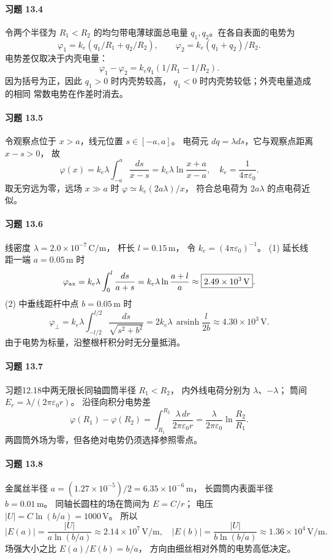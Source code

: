\paragraph{习题 13.4}
令两个半径为 \(R_1<R_2\) 的均匀带电薄球面总电量
\(q_1,q_2\)。在各自表面的电势为
\[
 \boxed{\varphi_1=k_e(q_1/R_1+q_2/R_2)},\qquad
 \boxed{\varphi_2=k_e(q_1+q_2)/R_2}.
\]
电势差仅取决于内壳电量：
\[
 \boxed{\varphi_1-\varphi_2
 =k_eq_1(1/R_1-1/R_2)}.
\]
因为括号为正，因此 \(q_1>0\) 时内壳势较高，
\(q_1<0\) 时内壳势较低；外壳电量造成的相同
常数电势在作差时消去。

\paragraph{习题 13.5}
令观察点位于 \(x>a\)，线元位置 \(s\in[-a,a]\)。
电荷元 \(dq=\lambda ds\)，它与观察点距离 \(x-s>0\)，
故
\[
 \varphi(x)=k_e\lambda\int_{-a}^a\frac{ds}{x-s}
 =\boxed{k_e\lambda\ln\frac{x+a}{x-a}},\quad
 k_e=\frac1{4\pi\varepsilon_0}.
\]
取无穷远为零，远场 \(x\gg a\) 时
\(\varphi\simeq k_e(2a\lambda)/x\)，
符合总电荷为 \(2a\lambda\) 的点电荷近似。

\paragraph{习题 13.6}
线密度 \(\lambda=2.0\times10^{-7}\,\mathrm{C/m}\)，
杆长 \(l=0.15\,\mathrm m\)，
令 \(k_e=(4\pi\varepsilon_0)^{-1}\)。
(1) 延长线距一端 \(a=0.05\,\mathrm m\) 时
\[
 \varphi_{\rm ax}=k_e\lambda\int_0^l\frac{ds}{a+s}
 =k_e\lambda\ln\frac{a+l}{a}
 \approx\boxed{2.49\times10^3\,\mathrm V}.
\]
(2) 中垂线距杆中点 \(b=0.05\,\mathrm m\) 时
\[
 \varphi_\perp=k_e\lambda
 \int_{-l/2}^{l/2}\frac{ds}{\sqrt{s^2+b^2}}
 =2k_e\lambda\,\operatorname{arsinh}\frac{l}{2b}
 \approx\boxed{4.30\times10^3\,\mathrm V}.
\]
由于电势为标量，沿整根杆积分时无分量抵消。

\paragraph{习题 13.7}
习题12.18中两无限长同轴圆筒半径 \(R_1<R_2\)，
内外线电荷分别为 \(\lambda\)、\(-\lambda\)；
筒间
\(E_r=\lambda/(2\pi\varepsilon_0r)\)。
沿径向积分电势差
\[
 \boxed{\varphi(R_1)-\varphi(R_2)
 =\int_{R_1}^{R_2}\frac{\lambda\,dr}{2\pi\varepsilon_0r}
 =\frac{\lambda}{2\pi\varepsilon_0}\ln\frac{R_2}{R_1}}.
\]
两圆筒外场为零，但各绝对电势仍须选择参照零点。

\paragraph{习题 13.8}
金属丝半径 \(a=(1.27\times10^{-5})/2
=6.35\times10^{-6}\,\mathrm m\)，
长圆筒内表面半径 \(b=0.01\,\mathrm m\)。
同轴长圆柱的场在筒间为 \(E=C/r\)；
电压 \(|U|=C\ln(b/a)=1000\,\mathrm V\)。
所以
\[
 \boxed{|E(a)|=\frac{|U|}{a\ln(b/a)}
 \approx2.14\times10^7\,\mathrm{V/m}},
\quad
 \boxed{|E(b)|=\frac{|U|}{b\ln(b/a)}
 \approx1.36\times10^4\,\mathrm{V/m}}.
\]
场强大小之比 \(E(a)/E(b)=b/a\)，
方向由细丝相对外筒的电势高低决定。

